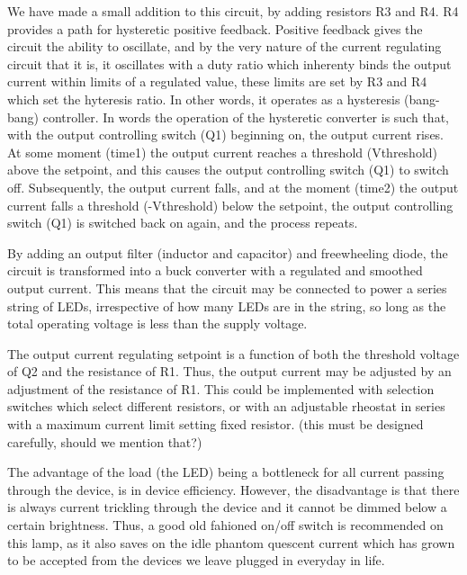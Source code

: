\documentclass[conference]{IEEEtran}
\begin{document}
We have made a small addition to this circuit, by adding resistors R3 and R4. R4 provides a path for hysteretic positive feedback. Positive feedback gives the circuit the ability to oscillate, and by the very nature of the current regulating circuit that it is, it oscillates with a duty ratio which inherenty binds the output current within limits of a regulated value, these limits are set by R3 and R4 which set the hyteresis ratio. In other words, it operates as a hysteresis (bang-bang) controller. In words the operation of the hysteretic converter is such that, with the output controlling switch (Q1) beginning on, the output current rises. At some moment (time1) the output current reaches a threshold (Vthreshold) above the setpoint, and this causes the output controlling switch (Q1) to switch off. Subsequently, the output current falls, and at the moment (time2) the output current falls a threshold (-Vthreshold) below the setpoint, the output controlling switch (Q1) is switched back on again, and the process repeats. 

By adding an output filter (inductor and capacitor) and freewheeling diode, the circuit is transformed into a buck converter with a regulated and smoothed output current. This means that the circuit may be connected to power a series string of LEDs, irrespective of how many LEDs are in the string, so long as the total operating voltage is less than the supply voltage.

The output current regulating setpoint is a function of both the threshold voltage of Q2 and the resistance of R1. Thus, the output current may be adjusted by an adjustment of the resistance of R1. This could be implemented with selection switches which select different resistors, or with an adjustable rheostat in series with a maximum current limit setting fixed resistor. (this must be designed carefully, should we mention that?)

The advantage of the load (the LED) being a bottleneck for all current passing through the device, is in device efficiency. However, the disadvantage is that there is always current trickling through the device and it cannot be dimmed below a certain brightness. Thus, a good old fahioned on/off switch is recommended on this lamp, as it also saves on the idle phantom quescent current which has grown to be accepted from the devices we leave plugged in everyday in life. 
\end{document}
